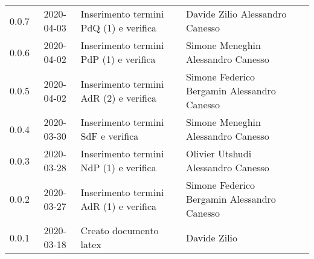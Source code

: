 {\begin{longtable}{ c c  C{4cm} C{3cm} C{3.5cm} }
		0.0.7 & 2020-04-03 & Inserimento termini PdQ (1) e verifica & Davide Zilio \newline Alessandro Canesso &\ana{} \newline \ver{} \\
		0.0.6 & 2020-04-02 & Inserimento termini PdP (1) e verifica & Simone Meneghin \newline Alessandro Canesso &\ana{} \newline \ver{} \\
		0.0.5 & 2020-04-02 & Inserimento termini AdR (2) e verifica & Simone Federico Bergamin \newline Alessandro Canesso &\ana{} \newline \ver{} \\
		0.0.4 & 2020-03-30 & Inserimento termini SdF e verifica & Simone Meneghin \newline Alessandro Canesso &\ana{} \newline \ver{} \\
		0.0.3 & 2020-03-28 & Inserimento termini NdP (1) e verifica & Olivier Utshudi \newline Alessandro Canesso &\ana{} \newline \ver{} \\
		0.0.2 & 2020-03-27 & Inserimento termini AdR (1) e verifica & Simone Federico Bergamin \newline Alessandro Canesso &\ana{} \newline \ver{} \\
		0.0.1 & 2020-03-18 & Creato documento latex & Davide Zilio &\ana{}\\		
		
	\end{longtable}

}